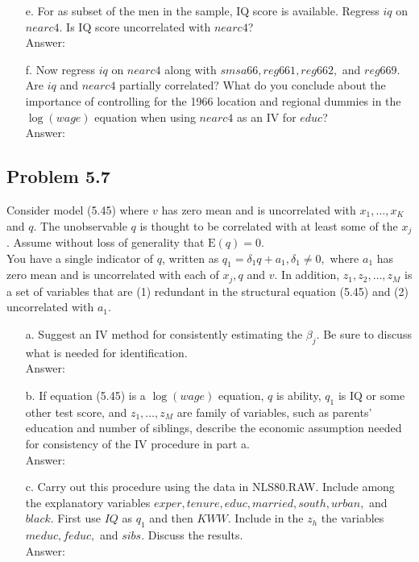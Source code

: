 \documentclass[10pt]{article}
\newcommand{\E}{\text{E}}
\begin{document}
\begin{enumerate}
\item[e.] For as subset of the men in the sample, IQ score is available. Regress $iq$ on $nearc4.$ Is IQ score uncorrelated with $nearc4$?
\\ Answer:\\

\item[f.] Now regress $iq$ on $nearc4$ along with $smsa66, reg661, reg662,$ and $reg669.$ Are $iq$ and $nearc4$ partially correlated? What do you conclude about the importance of controlling for the 1966 location and regional dummies in the $\log(wage)$ equation when using $nearc4$ as an IV for $educ$?
\\ Answer:\\

\end{enumerate}


\subsection*{Problem 5.7}
Consider model (5.45) where $v$ has zero mean and is uncorrelated with $x_1,\ldots,x_K$ and $q$. The unobservable $q$ is thought to be correlated with at least some of the $x_j$. Assume without loss of generality that $\E(q)=0.$\\
You have a single indicator of $q$, written as $q_1=\delta_1q+a_1,\delta_1\neq 0,$ where $a_1$ has zero mean and is uncorrelated with each of $x_j,q$ and $v$. In addition, $z_1,z_2,\ldots,z_M$ is a set of variables that are (1) redundant in the structural equation (5.45) and (2) uncorrelated with $a_1.$
\begin{enumerate}
\item[a.] Suggest an IV method for consistently estimating the $\beta_j.$ Be sure to discuss what is needed for identification.
\\ Answer:\\

\item[b.] If equation (5.45) is a $\log(wage)$ equation, $q$ is ability, $q_1$ is IQ or some other test score, and $z_1,\ldots,z_M$ are family of variables, such as parents' education and number of siblings, describe the economic assumption needed for consistency of the IV procedure in part a.
\\ Answer:\\

\item[c.] Carry out this procedure using the data in NLS80.RAW. Include among the explanatory variables $exper, tenure,educ,married,south,urban,$ and $black$. First use $IQ$ as $q_1$ and then $KWW$. Include in the $z_h$ the variables $meduc,feduc,$ and $sibs.$ Discuss the results.
\\ Answer:\\
\end{enumerate}
\end{document}
